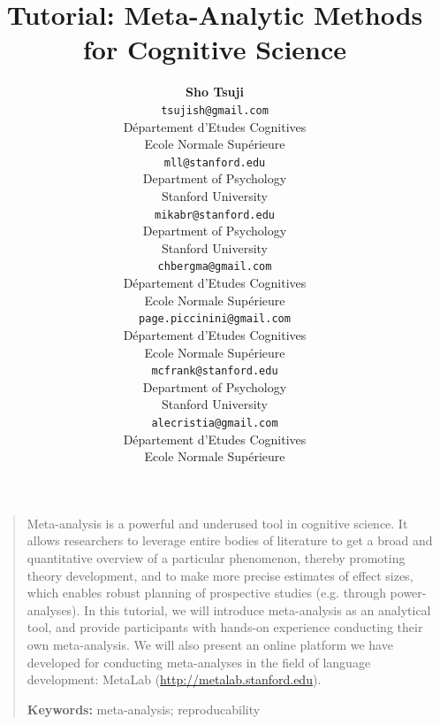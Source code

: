 \documentclass[10pt,letterpaper]{article}
\title{Tutorial: Meta-Analytic Methods for Cognitive Science}
\author{{\large \bf Sho Tsuji } \\
    \texttt{tsujish@gmail.com}\\
  D\'epartement d'Etudes Cognitives\\
   Ecole Normale Sup\'erieure
  \And {\large \bf Molly Lewis} \\
  \texttt{mll@stanford.edu}\\
    Department of Psychology\\
    Stanford University
  \And {\large \bf Mika Braginsky} \\
    \texttt{mikabr@stanford.edu}\\
      Department of Psychology\\
      Stanford University
  \AND {\large \bf Christina Bergmann} \\
      \texttt{chbergma@gmail.com}\\
  D\'epartement d'Etudes Cognitives\\
   Ecole Normale Sup\'erieure
     \And      {\large \bf Page Piccinini } \\
     \texttt{page.piccinini@gmail.com}\\
  D\'epartement d'Etudes Cognitives\\
   Ecole Normale Sup\'erieure
  \And        {\large \bf Michael C. Frank} \\
     \texttt{mcfrank@stanford.edu}\\
            Department of Psychology \\
            Stanford University
  \AND          {\large \bf Alejandrina Cristia} \\
      \texttt{alecristia@gmail.com}\\
  D\'epartement d'Etudes Cognitives\\
   Ecole Normale Sup\'erieure}
\begin{document}
\maketitle

\begin{quote}
\small
Meta-analysis is a powerful and underused tool in cognitive science. It allows researchers to leverage entire bodies of literature to get a broad and quantitative overview of a particular phenomenon, thereby promoting theory development, and to make more precise estimates of effect sizes, which enables robust planning of prospective studies (e.g. through power-analyses). In this tutorial, we will introduce meta-analysis as an analytical tool, and provide participants with hands-on experience conducting their own meta-analysis. We will also present an online platform we have developed for conducting meta-analyses in the field of language development: MetaLab (\url{http://metalab.stanford.edu}). 

\textbf{Keywords:}
meta-analysis; reproducability
\end{quote}


\end{document}
